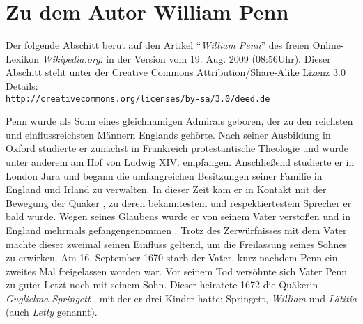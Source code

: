 \chapter{Zu dem Autor William Penn}\label{ref:zum_autor_penn}

\begin{center}
\begin{footnotesize}
\begin{minipage}[c]{7.5cm}
Der folgende Abschitt berut auf den Artikel "`\textit{William Penn}"' des freien
Online-Lexikon \textit{Wikipedia.org}. in der Version vom  19. Aug. 2009 (08:56Uhr).
Dieser Abschitt steht unter der Creative Commons Attribution/Share-Alike Lizenz
3.0 Details:
\\ \texttt{http://creativecommons.org/licenses/by-sa/3.0/deed.de}
\end{minipage}
\end{footnotesize}
\end{center}


\smallskip

Penn wurde als Sohn eines gleichnamigen Admirals geboren, der zu den
reichsten und einflussreichsten Männern Englands gehörte. Nach seiner
Ausbildung in Oxford studierte er zunächst in Frankreich  protestantische
Theologie  und wurde unter anderem am Hof von Ludwig XIV.  empfangen. Anschließend studierte  er in London 
Jura und begann die umfangreichen Besitzungen seiner
Familie in England  und Irland  zu verwalten. In dieser Zeit kam er in Kontakt mit
der Bewegung der Quaker , zu deren bekanntestem und respektiertestem Sprecher
er bald wurde. Wegen seines Glaubens wurde er von seinem Vater  verstoßen und in
England mehrmals gefangengenommen . Trotz des Zerwürfnisses mit dem Vater machte
dieser zweimal seinen Einfluss geltend, um die Freilassung seines Sohnes zu
erwirken. Am 16. September 1670 starb der Vater, kurz nachdem Penn ein
zweites Mal freigelassen worden war. Vor seinem Tod versöhnte sich Vater Penn zu
guter Letzt noch mit seinem Sohn. Dieser heiratete  1672 die Quäkerin
\textit{Guglielma Springett} , mit der er drei Kinder hatte: Springett,
\textit{William} und \textit{Lätitia} (auch \textit{Letty} genannt).

